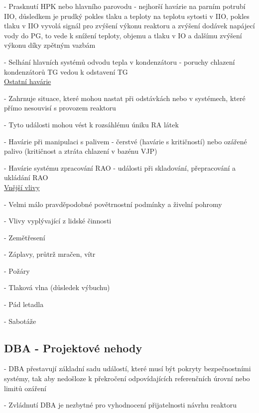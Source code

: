 \noindent - 	Prasknutí HPK nebo hlavního parovodu - nejhorší havárie na parním potrubí IIO, důsledkem je prudký pokles tlaku a teploty na teplotu sytosti v IIO, pokles tlaku v IIO vyvolá signál pro zvýšení výkonu reaktoru a zvýšení dodávek napájecí vody do PG, to vede k snížení teploty, objemu a tlaku v IO a dalšímu zvýšení výkonu díky zpětným vazbám

\noindent - 	Selhání hlavních systémů odvodu tepla v kondenzátoru - poruchy chlazení kondenzátorů TG vedou k odstavení TG 
\\

\underline{Ostatní havárie}

\noindent - 	Zahrnuje situace, které mohou nastat při odstávkách nebo v systémech, které přímo nesouvisí s provozem reaktoru

\noindent - 	Tyto události mohou vést k rozsáhlému úniku RA látek

\noindent - 	Havárie při manipulaci s palivem - čerstvé (havárie s kritičností) nebo ozářené palivo (kritičnost a ztráta chlazení v bazénu VJP)

\noindent - 	Havárie systému zpracování RAO - události při skladování, přepracování a ukládání RAO
\\

\underline{Vnější vlivy}

\noindent - 	Velmi málo pravděpodobné povětrnostní podmínky a živelní pohromy

\noindent - 	Vlivy vyplývající z lidské činnosti

\noindent - 	Zemětřesení

\noindent - 	Záplavy, průtrž mračen, vítr

\noindent - 	Požáry

\noindent - 	Tlaková vlna (důsledek výbuchu)

\noindent - 	Pád letadla

\noindent - 	Sabotáže

\vspace{8pt}
\subsection{DBA - Projektové nehody}

\noindent - 	DBA přestavují základní sadu událostí, které musí být pokryty bezpečnostními systémy, tak aby nedošloze k překročení odpovídajících referenčních úrovní nebo limitů ozáření

\noindent - 	Zvládnutí DBA je nezbytné pro vyhodnocení přijatelnosti návrhu reaktoru

